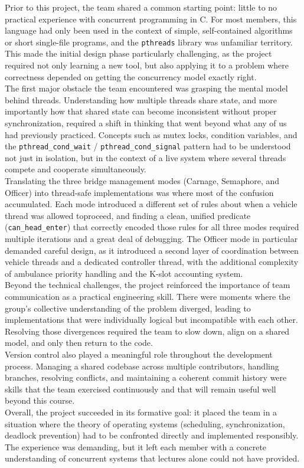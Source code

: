 \documentclass[12pt]{article}
\begin{document}
Prior to this project, the team shared a common starting point: little to no practical
experience with concurrent programming in C. For most members, this language had only been
used in the context of simple, self-contained algorithms or short single-file programs,
and the \texttt{pthreads} library was unfamiliar territory. This made the
initial design phase particularly challenging, as the project required not only learning
a new tool, but also applying it to a problem where correctness depended on getting
the concurrency model exactly right.\\
The first major obstacle the team encountered was grasping the mental model behind
threads. Understanding how multiple threads share state, and more importantly how
that shared state can become inconsistent without proper synchronization, required a
shift in thinking that went beyond what any of us had previously practiced. Concepts
such as mutex locks, condition variables, and the \texttt{pthread\_cond\_wait} /
\texttt{pthread\_cond\_signal} pattern had to be understood not just in isolation, but
in the context of a live system where several threads compete and cooperate simultaneously.\\
Translating the three bridge management modes (Carnage, Semaphore, and Officer) into thread-safe implementations was where most of the confusion accumulated. 
Each mode introduced a different set of rules about when a vehicle thread was allowed toproceed, and finding a clean, unified 
predicate (\texttt{can\_head\_enter}) that correctly encoded those rules for all three modes required multiple iterations and
a great deal of debugging. The Officer mode in particular demanded careful design, as it introduced a second layer of coordination between vehicle threads and a dedicated controller thread, 
with the additional complexity of ambulance priority handling and the K-slot accounting system.\\
Beyond the technical challenges, the project reinforced the importance of team communication as a practical engineering skill. 
There were moments where the group's collective understanding of the problem diverged, leading to implementations
that were individually logical but incompatible with each other. Resolving those divergences required the team to slow down, align on a shared model, and only then return to the code.\\
Version control also played a meaningful role throughout the development process. 
Managing a shared codebase across multiple contributors, handling branches, resolving conflicts, and maintaining a coherent commit history were skills that the team exercised continuously and that will remain useful well beyond this course.\\
Overall, the project succeeded in its formative goal: it placed the team in a situation where the theory of operating systems (scheduling, synchronization, deadlock prevention) had to be confronted directly and implemented responsibly. 
The experience was demanding, but it left each member with a concrete understanding of concurrent systems that lectures alone could not have provided.
\end{document}
